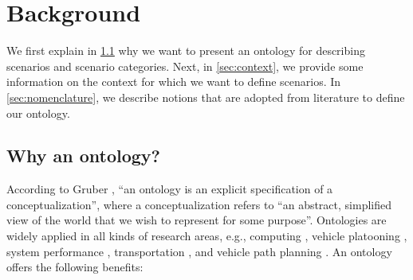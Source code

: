 \section{Background}
\label{sec:background}

We first explain in \cref{sec:why ontology} why we want to present an ontology for describing scenarios and  scenario categories. Next, in \cref{sec:context}, we provide some information on the context for which we want to define scenarios. In \cref{sec:nomenclature}, we describe notions that are adopted from literature to define our ontology.



\subsection{Why an ontology?}
\label{sec:why ontology}
According to Gruber \autocite{gruber1993ontology}, ``an ontology is an explicit specification of a conceptualization'', where a conceptualization refers to ``an abstract, simplified view of the world that we wish to represent for some purpose''. Ontologies are widely applied in all kinds of research areas, e.g., computing \autocite{chen2004soupa}, vehicle platooning \autocite{maiti2017conceptualization}, system performance \autocite{benvenuti2017ontologybased}, transportation \autocite{katsumi2018ontologies}, and vehicle path planning \autocite{provine2004ontology, schlenoff2003using}. 
An ontology offers the following benefits:
